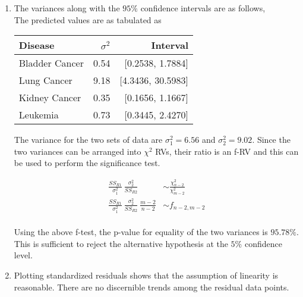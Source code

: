 \begin{enumerate}
\item The variances along with the $ 95\% $ confidence intervals are as follows,\\

The predicted values are as tabulated as \\
\begin{table}[H]
	\centering
	\begin{tabular}{@{}lrr@{}}
		\toprule
		Disease		& $ \sigma^2 $	& Interval \\
		\midrule
		Bladder Cancer	& 0.54	& [0.2538, 1.7884]\\
		Lung Cancer	& 9.18	& [4.3436, 30.5983]\\
		Kidney Cancer	& 0.35	& [0.1656, 1.1667]\\
		Leukemia	& 0.73	& [0.3445, 2.4270]\\
		\bottomrule
	\end{tabular}
\end{table}

The variance for the two sets of data are $ \sigma_1^2 = 6.56 $ and $ \sigma_2^2 = 9.02 $. Since the two variances can be arranged into $ \chi^2 $ RVs, their ratio is an f-RV and this can be used to perform the significance test.

\begin{align}
	\frac{SS_{R1}}{\sigma_1^2}\ \frac{\sigma_2^2}{SS_{R2}} &\sim \frac{\chi^2_{n-2}}{\chi^2_{m-2}} \nonumber \\
	\frac{SS_{R1}}{\sigma_1^2}\ \frac{\sigma_2^2}{SS_{R2}}\ \frac{m-2}{n-2} &\sim f_{n-2, m-2}
\end{align}\\

Using the above f-test, the p-value for equality of the two variances is $ 95.78\% $. This is sufficient to reject the alternative hypothesis at the $ 5\% $ confidence level.\\

\item Plotting standardized residuals shows that the assumption of linearity is reasonable. There are no discernible trends among the residual data points.\\

\begin{figure}[H]
	\centering
\end{figure}


\end{enumerate}
